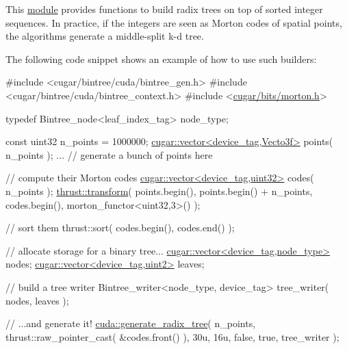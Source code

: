 This \hyperlink{group__radixtree}{module} provides functions to build radix trees on top of sorted integer sequences. In practice, if the integers are seen as Morton codes of spatial points, the algorithms generate a middle-\/split k-\/d tree.

The following code snippet shows an example of how to use such builders\+:


\begin{DoxyCode}
\textcolor{preprocessor}{#include <cugar/bintree/cuda/bintree\_gen.h>}
\textcolor{preprocessor}{#include <cugar/bintree/cuda/bintree\_context.h>}
\textcolor{preprocessor}{#include <\hyperlink{morton_8h}{cugar/bits/morton.h}>}

\textcolor{keyword}{typedef} Bintree\_node<leaf\_index\_tag> node\_type;

\textcolor{keyword}{const} uint32 n\_points = 1000000;
\hyperlink{structcugar_1_1vector}{cugar::vector<device\_tag,Vecto3f>} points( n\_points );
... \textcolor{comment}{// generate a bunch of points here}

\textcolor{comment}{// compute their Morton codes}
\hyperlink{structcugar_1_1vector}{cugar::vector<device\_tag,uint32>} codes( n\_points );
\hyperlink{group___primitives_gab584ee91ed39f9b1fec5aa0e7a0284a4}{thrust::transform}(
    points.begin(),
    points.begin() + n\_points,
    codes.begin(),
    morton\_functor<uint32,3>() );

\textcolor{comment}{// sort them}
thrust::sort( codes.begin(), codes.end() );

\textcolor{comment}{// allocate storage for a binary tree...}
\hyperlink{structcugar_1_1vector}{cugar::vector<device\_tag,node\_type>} nodes;
\hyperlink{structcugar_1_1vector}{cugar::vector<device\_tag,uint2>}     leaves;

\textcolor{comment}{// build a tree writer}
Bintree\_writer<node\_type, device\_tag> tree\_writer( nodes, leaves );

\textcolor{comment}{// ...and generate it!}
\hyperlink{group__radixtree_gafb888a81f085548c89a282181d74649a}{cuda::generate\_radix\_tree}(
    n\_points,
    thrust::raw\_pointer\_cast( &codes.front() ),
    30u,
    16u,
    \textcolor{keyword}{false},
    \textcolor{keyword}{true},
    tree\_writer );
\end{DoxyCode}
 